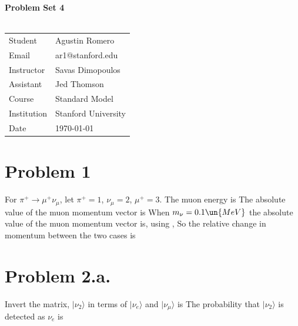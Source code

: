 \documentclass{article}
\begin{document}
\begin{center}
\textbf{\Large{Problem Set 4}}\\~\\
\begin{tabular}{l l}
Student&Agustin Romero\\
Email&ar1@stanford.edu\\
Instructor&Savas Dimopoulos\\
Assistant&Jed Thomson\\
Course&Standard Model\\
Institution&Stanford University\\
Date&\today\\
\end{tabular}
\end{center}
\section*{Problem 1}
For $\pi^+ \rightarrow \mu^+ \nu_\mu$, let $\pi^+=1$, $\nu_\mu=2$, $\mu^+=3$.
The muon energy is
The absolute value of the muon momentum vector is
When $m_\nu=0.1\un{MeV}$ the absolute value of the muon momentum vector is, using ,
So the relative change in momentum between the two cases is
\section*{Problem 2.a.}
Invert the matrix,
$|\nu_2\rangle$ in terms of $|\nu_e\rangle$ and $|\nu_\mu \rangle$ is
The probability that $|\nu_2\rangle$ is detected as $\nu_e$ is
\end{document}
